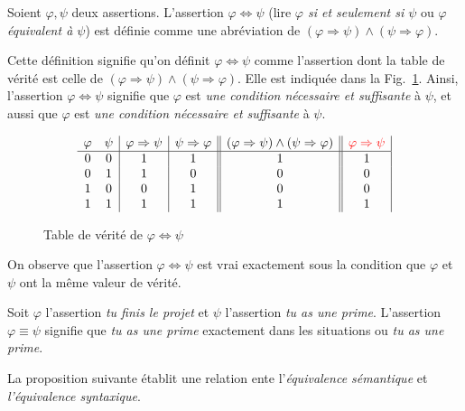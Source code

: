\documentclass[french,course,oneside,theoremnosection]{lecture}
\newcommand{\iimplies}{\Rightarrow}
\newcommand{\ifff}{\Leftrightarrow}
\begin{document}
\begin{definition}
Soient $\varphi, \psi$ deux assertions. L'assertion $\varphi \ifff \psi$ (lire \emph{$\varphi$ si et seulement si $\psi$} ou \emph{$\varphi$ équivalent à $\psi$}) est définie comme une abréviation de $(\varphi \iimplies \psi) \wedge (\psi \iimplies \varphi)$. 
\end{definition}
Cette définition signifie qu'on définit $\varphi \ifff \psi$ comme l'assertion dont la table de vérité est celle de $(\varphi \iimplies \psi) \wedge (\psi \iimplies \varphi)$. Elle est indiquée dans la Fig.~\ref{fig:equiv}. Ainsi, l'assertion $\varphi \ifff \psi$ signifie que $\varphi$ est \emph{une condition nécessaire et suffisante} à $\psi$, et aussi que $\varphi$ est \emph{une condition nécessaire et suffisante} à $\psi$.
\begin{figure}
\[
\begin{array}{cc|c|c||c||c|c}
  \varphi & \psi & \varphi \iimplies \psi & \psi \iimplies \varphi & (\varphi \iimplies \psi) \wedge (\psi \iimplies \varphi) &\color{red} \varphi \iimplies \psi\color{black} \\
  \hline
  0 & 0 & 1 & 1 & 1 & 1 \\
  0 & 1 & 1 & 0 & 0 & 0\\
  1 & 0 & 0 & 1 & 0 & 0\\
  1 & 1 & 1 & 1 & 1 & 1\\
\end{array}
\]\caption{Table de vérité de $\varphi \ifff \psi$}\label{fig:equiv}
\end{figure}

On observe que l'assertion $\varphi \ifff \psi$ est vrai exactement sous la condition que $\varphi$ et $\psi$ ont la même valeur de vérité.

\begin{example}
Soit $\varphi$ l'assertion \emph{tu finis le projet} et $\psi$ l'assertion \emph{tu as une prime}. L'assertion $\varphi \equiv \psi$ signifie que \emph{tu as une prime} exactement dans les situations ou \emph{tu as une prime}.
\end{example}

La proposition suivante établit une relation ente l'\emph{équivalence sémantique} et \emph{l'équivalence syntaxique}.
\end{document}
